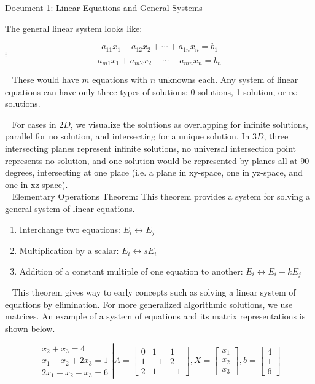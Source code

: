 \documentclass[12pt]{article}
\begin{document}
\begin{center}
Document 1: Linear Equations and General Systems
\end{center}

\setlength{\leftskip}{0.25 in}
The general linear system looks like:

$$a_{11}x_1+a_{12}x_{2}+\cdots+a_{1n}x_n=b_1$$
\setlength{\leftskip}{1.3 in}
$\vdots$
$$a_{m1}x_1+a_{m2}x_{2}+\cdots+a_{mn}x_n=b_n$$

\setlength{\leftskip}{0 in}

$\,\,\,$ These would have $m$ equations with $n$ unknowns each. Any system of linear equations can have only three types of solutions: 0 solutions, 1 solution, or $\infty$ solutions.

$\,\,\,$ For cases in $2D$, we visualize the solutions as overlapping for infinite solutions, parallel for no solution, and intersecting for a unique solution. In $3D$, three intersecting planes represent infinite solutions, no universal intersection point represents no solution, and one solution would be represented by planes all at 90 degrees, intersecting at one place (i.e. a plane in xy-space, one in yz-space, and one in xz-space).\\

$\,\,\,$ Elementary Operations Theorem: This theorem provides a system for solving a general system of linear equations.

\begin{enumerate}
\item Interchange two equations: $E_i \leftrightarrow E_j$
\item Multiplication by a scalar: $E_i \leftrightarrow sE_i$
\item Addition of a constant multiple of one equation to another: $E_i \leftrightarrow E_i + kE_j$
\end{enumerate}

$\,\,\,$ This theorem gives way to early concepts such as solving a linear system of equations by elimination. For more generalized algorithmic solutions, we use matrices. An example of a system of equations and its matrix representations is shown below.

$$\left.
\begin{matrix}
x_2+x_3=4\\
x_1-x_2+2x_3=1\\
2x_1+x_2-x_3=6
\end{matrix}
\right|
A=
\begin{bmatrix}
0 & 1 & 1\\
1 & -1 & 2\\
2 & 1 & -1
\end{bmatrix}
,
X=
\begin{bmatrix}
x_1\\
x_2\\
x_3
\end{bmatrix}
,
b=
\begin{bmatrix}
4\\
1\\
6
\end{bmatrix}
$$
\end{document}
